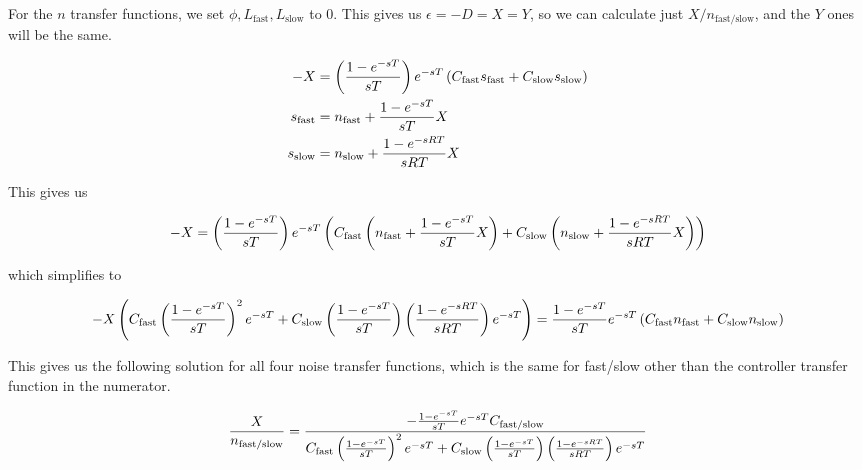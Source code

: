 \documentclass{article}
\begin{document}
    For the $n$ transfer functions, we set $\phi, L_\text{fast}, L_\text{slow}$ to 0. This gives us $\epsilon = -D = X = Y$, so we can calculate just $X / n_\text{fast/slow}$, and the $Y$ ones will be the same.

    \begin{align*}
        -X &= \left(\frac{1 - e^{-sT}}{sT}\right) e^{-sT} \left(C_{\text{fast}} s_{\text{fast}} + C_{\text{slow}} s_{\text{slow}}\right) \\
        s_{\text{fast}} &= n_{\text{fast}} + \frac{1 - e^{-sT}}{sT} X \\
        s_{\text{slow}} &= n_{\text{slow}} + \frac{1 - e^{-sRT}}{sRT} X \\
    \end{align*}

    This gives us

    \begin{align*}
        -X &= \left(\frac{1 - e^{-sT}}{sT}\right) e^{-sT} \left(C_{\text{fast}} \left(n_{\text{fast}} + \frac{1 - e^{-sT}}{sT} X\right) + C_{\text{slow}} \left(n_{\text{slow}} + \frac{1 - e^{-sRT}}{sRT} X\right)\right) \\
    \end{align*}

    which simplifies to

    \begin{align*}
        -X \left(C_\text{fast} \left(\frac{1 - e^{-sT}}{sT}\right)^2 e^{-sT} + C_\text{slow} \left(\frac{1 - e^{-sT}}{sT}\right) \left(\frac{1 - e^{-sRT}}{sRT}\right)  e^{-sT}\right) = \frac{1 - e^{-sT}}{sT} e^{-sT} \left(C_\text{fast} n_\text{fast} + C_\text{slow} n_\text{slow}\right)
    \end{align*}

    This gives us the following solution for all four noise transfer functions, which is the same for fast/slow other than the controller transfer function in the numerator.

    \begin{align*}
        \frac{X}{n_\text{fast/slow}} = \frac{-\frac{1 - e^{-sT}}{sT} e^{-sT} C_{\text{fast/slow}}}{C_\text{fast} \left(\frac{1 - e^{-sT}}{sT}\right)^2 e^{-sT} + C_\text{slow} \left(\frac{1 - e^{-sT}}{sT}\right) \left(\frac{1 - e^{-sRT}}{sRT}\right)  e^{-sT}}
    \end{align*}
\end{document}
